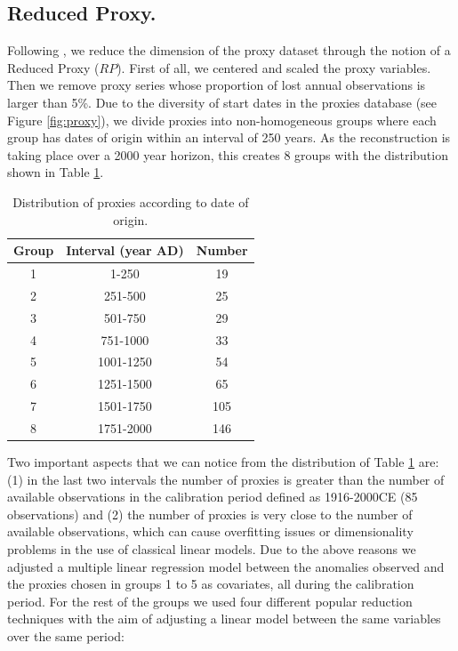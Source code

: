 \documentclass[11pt]{amsart}
\theoremstyle{plain}
\theoremstyle{definition}
\theoremstyle{remark}
\begin{document}
\subsection{Reduced Proxy.}
\label{sec:rp}
Following \cite{Barboza2014}, we reduce the dimension of the proxy dataset
through the notion of a Reduced Proxy ($RP$). First of all, we centered and
scaled the proxy variables. Then we remove proxy series whose proportion of lost
annual 
observations is larger than 5\%. Due to the diversity of start
dates in the proxies database (see Figure \ref{fig:proxy}), we divide
proxies into non-homogeneous groups where each group has dates of origin within an
interval of 250 years. As the reconstruction is taking place over a 2000 year
horizon, this creates 8 groups with the distribution shown in Table \ref{tab:distdate}.
\begin{table}
  \centering
  \begin{tabular}{c|c|c}
    \toprule
    Group & Interval (year AD) & Number \\
    \midrule
    1 & 1-250 & 19 \\
    2 & 251-500 & 25 \\
    3 & 501-750 & 29 \\
    4 & 751-1000 & 33 \\
    5 & 1001-1250 & 54 \\
    6 & 1251-1500 & 65 \\
    7 & 1501-1750 & 105 \\
    8 & 1751-2000 & 146 \\
    \bottomrule
  \end{tabular}
  \caption{Distribution of proxies according to date of origin.}
  \label{tab:distdate}
\end{table}
Two important aspects that we can notice from the distribution of Table
\ref{tab:distdate} are: (1) in the last two intervals the number of proxies is greater than
the number of available observations in the calibration period defined as
1916-2000CE (85 observations) and (2) the number of proxies is very close to the
number of available observations, which can cause overfitting issues or
dimensionality problems in the use of classical linear models. Due to the above
reasons we adjusted a multiple linear regression model between the anomalies
observed and the proxies chosen in groups 1 to 5 as covariates, all during the calibration
period. For the rest of the groups we used four different popular reduction
techniques with the aim of adjusting a linear model between the same variables over the same period: 
\end{document}
